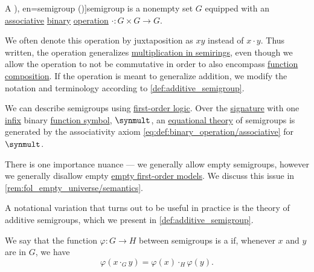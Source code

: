 \begin{definition}\label{def:semigroup}
  A \term[ru=полугруппа (\cite[28]{Ляпин1960Полугруппы}), en=semigroup (\cite[1]{Golan1999Semirings})]{semigroup} is a nonempty set \( G \) equipped with an \hyperref[def:binary_operation/associative]{associative} \hyperref[def:operation_arity_terminology]{binary} \hyperref[def:operation_on_set]{operation} \( \cdot: G \times G \to G \).

  We often denote this operation by juxtaposition as \( xy \) instead of \( x \cdot y \). Thus written, the operation generalizes \hyperref[def:semiring]{multiplication in semirings}, even though we allow the operation to not be commutative in order to also encompass \hyperref[def:set_valued_function/composition]{function composition}. If the operation is meant to generalize addition, we modify the notation and terminology according to \cref{def:additive_semigroup}.

  \begin{thmenum}[series=def:semigroup]
    \mimprovised We can describe semigroups using \hyperref[def:first_order_logic]{first-order logic}. Over the \hyperref[def:fol_signature]{signature} with one \hyperref[def:fol_signature/notation]{infix} binary \hyperref[def:fol_signature/function]{function symbol}, \( \synmult \), an \hyperref[def:fol_equational_theory]{equational theory} of semigroups is generated by the associativity axiom \eqref{eq:def:binary_operation/associative} for \( \synmult \).

    There is one importance nuance --- we generally allow empty semigroups, however we generally disallow empty \hyperref[def:fol_semantics/model]{empty first-order models}. We discuss this issue in \cref{rem:fol_empty_universe/semantics}.

    A notational variation that turns out to be useful in practice is the theory of additive semigroups, which we present in \cref{def:additive_semigroup}.

     We say that the function \( \varphi: G \to H \) between semigroups is a  if, whenever \( x \) and \( y \) are in \( G \), we have
    \begin{equation}\label{eq:def:semigroup/morphism}
      \varphi(x \cdot_G y) = \varphi(x) \cdot_H \varphi(y).
    \end{equation}


\end{thmenum}
\end{definition}

